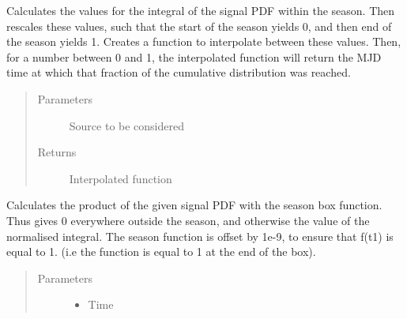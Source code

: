 \documentclass[letterpaper,10pt,english]{sphinxmanual}
\begin{document}
\begin{fulllineitems}

\begin{fulllineitems}
\label{\detokenize{index:flarestack.core.time_pdf.TimePDF.create}}
\end{fulllineitems}


\begin{fulllineitems}
\label{\detokenize{index:flarestack.core.time_pdf.TimePDF.inverse_interpolate}}
Calculates the values for the integral of the signal PDF within
the season. Then rescales these values, such that the start of the
season yields 0, and then end of the season yields 1. Creates a
function to interpolate between these values. Then, for a number
between 0 and 1, the interpolated function will return the MJD time
at which that fraction of the cumulative distribution was reached.
\begin{quote}\begin{description}
\item[{Parameters}] \leavevmode
{} \textendash{} Source to be considered

\item[{Returns}] \leavevmode
Interpolated function

\end{description}\end{quote}

\end{fulllineitems}


\begin{fulllineitems}
\label{\detokenize{index:flarestack.core.time_pdf.TimePDF.product_integral}}
Calculates the product of the given signal PDF with the season box
function. Thus gives 0 everywhere outside the season, and otherwise
the value of the normalised integral. The season function is offset
by 1e-9, to ensure that f(t1) is equal to 1. (i.e the function is
equal to 1 at the end of the box).
\begin{quote}\begin{description}
\item[{Parameters}] \leavevmode\begin{itemize}
\item {} 
 \textendash{} Time


\end{itemize}
\end{description}
\end{quote}
\end{fulllineitems}
\end{fulllineitems}
\end{document}
